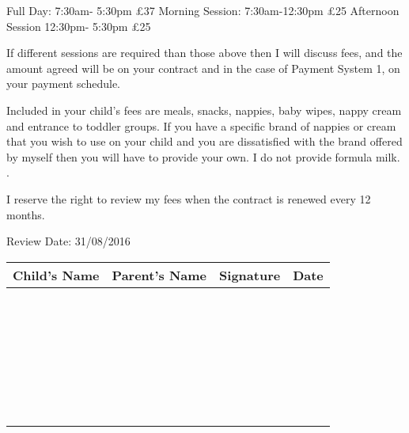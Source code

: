 Full Day: 7:30am- 5:30pm £37
Morning Session: 7:30am-12:30pm £25
Afternoon Session 12:30pm- 5:30pm £25

If different sessions are required than those above then I will discuss fees, and the amount agreed will be on your contract and in the case of Payment System 1, on your payment schedule.

Included in your child's fees are meals, snacks, nappies, baby wipes, nappy cream and entrance to toddler groups. If you have a specific brand of nappies or cream that you wish to use on your child and you are dissatisfied with the brand offered by myself then you will have to provide your own. I do not provide formula milk. . 

I reserve the right to review my fees when the contract is renewed every 12 months.

Review Date: 31/08/2016

\begin{table}[h]
  \def\arraystretch{2.0}
  \begin{tabularx}{\textwidth}{!{\color{gray}\vrule}X!{\color{gray}\vrule}X!{\color{gray}\vrule}X!{\color{gray}\vrule}X!{\color{gray}\vrule}}
    \hline
    Child's Name & Parent's Name & Signature & Date \\
    \hline
    ~ & ~ & ~ & \\
    \hline
    ~ & ~ & ~ & \\
    \hline
    ~ & ~ & ~ & \\
    \hline
    ~ & ~ & ~ & \\
    \hline
    ~ & ~ & ~ & \\
    \hline
    ~ & ~ & ~ & \\
    \hline
  \end{tabularx}
\end{table}




